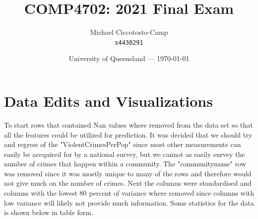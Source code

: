 \documentclass{article}
\title{COMP4702: 2021 Final Exam} %
\author{Michael Ciccotosto-Camp\\ \texttt{s4430291}} %
\date{University of Queensland --- \today}
\begin{document}
\maketitle %

\section*{Data Edits and Visualizations}


To start rows that contained Nan values where removed from the data set so that all the features could be utilized for prediction. It was decided that we should try and regress of the "ViolentCrimesPerPop" since most other measurements can easily be accquired for by a national survey, but we cannot as easily survey the number of crimes that happen within a community. The "communityname" row was removed since it was mostly unique to many of the rows and therefore would not give much on the number of crimes. Next the columns were standardised and columns with the lowest 80 percent of variance where removed since columns with low variance will likely not provide much information. Some statistics for the data is shown below in table form.
\end{document}
